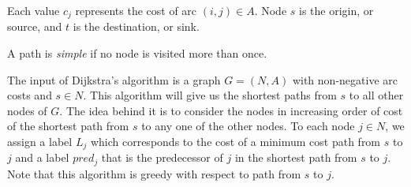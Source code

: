 \documentclass[12pt, a4paper]{report}
\begin{document}
    Each value $c_j$ represents the cost  of arc $(i,j) \in A$. Node $s$ is the origin, or source, and $t$ is the destination, or sink. 
    \begin{definition}
        A path is \emph{simple} if no node is visited more than once. 
    \end{definition}
    The input of Dijkstra's algorithm is a graph $G = (N, A)$ with non-negative arc costs and $s \in N$. This algorithm will give us the shortest paths from $s$ to 
    all other nodes of $G$. The idea behind it is to consider the nodes in increasing order of cost of the shortest path from $s$ to any one of the other nodes. 
    To each node $j \in N$, we assign a label $L_j$ which corresponds to the cost of a minimum cost path from $s$ to $j$ and a label $pred_j$ that is the predecessor of $j$ in the
    shortest path from $s$ to $j$. Note that this algorithm is greedy with respect to path from $s$ to $j$. 
\end{document}
